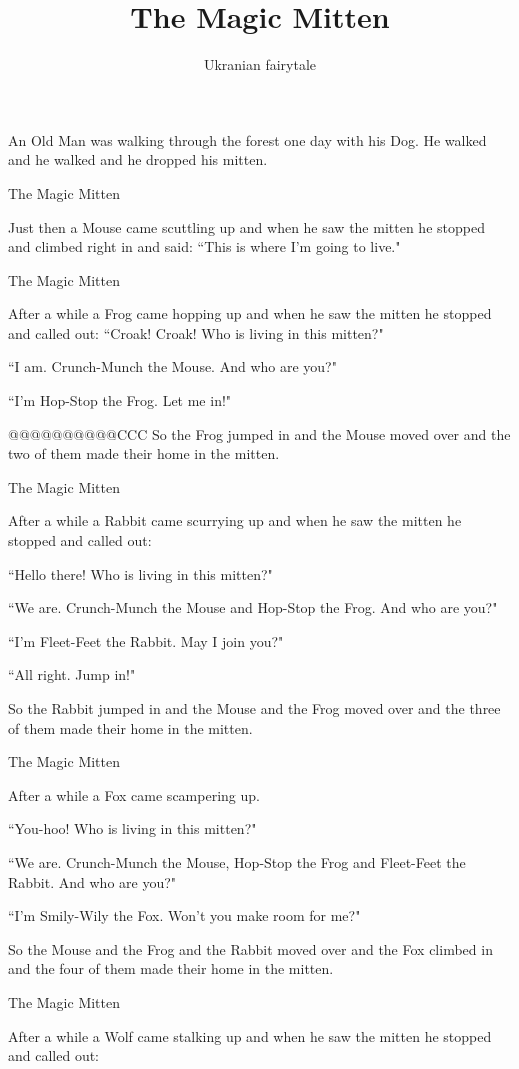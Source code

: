 \documentclass{article}
\title{The Magic Mitten}
\author{Ukranian fairytale}
\begin{document}
\maketitle

An Old Man was walking through the forest one day with his Dog. He walked and he walked and he dropped his mitten.

The Magic Mitten

Just then a Mouse came scuttling up and when he saw the mitten he stopped and climbed right in and said: ``This is where I'm going to live."

The Magic Mitten

After a while a Frog came hopping up and when he saw the mitten he stopped and called out:
``Croak! Croak! Who is living in this mitten?"

``I am. Crunch-Munch the Mouse. And who are you?"

``I'm Hop-Stop the Frog. Let me in!"

@@@@@@@@@@CCC
So the Frog jumped in and the Mouse moved over and the two of them made their home in the mitten.

The Magic Mitten

After a while a Rabbit came scurrying up and when he saw the mitten he stopped and called out:

``Hello there! Who is living in this mitten?"

``We are. Crunch-Munch the Mouse and Hop-Stop the Frog. And who are you?"

``I'm Fleet-Feet the Rabbit. May I join you?"

``All right. Jump in!"

So the Rabbit jumped in and the Mouse and the Frog moved over and the three of them made their home in the mitten.

The Magic Mitten

After a while a Fox came scampering up.

``You-hoo! Who is living in this mitten?"

``We are. Crunch-Munch the Mouse, Hop-Stop the Frog and Fleet-Feet the Rabbit. And who are you?"

``I'm Smily-Wily the Fox. Won't you make room for me?"

So the Mouse and the Frog and the Rabbit moved over and the Fox climbed in and the four of them made their home in the mitten.

The Magic Mitten

After a while a Wolf came stalking up and when he saw the mitten he stopped and called out:
\end{document}
